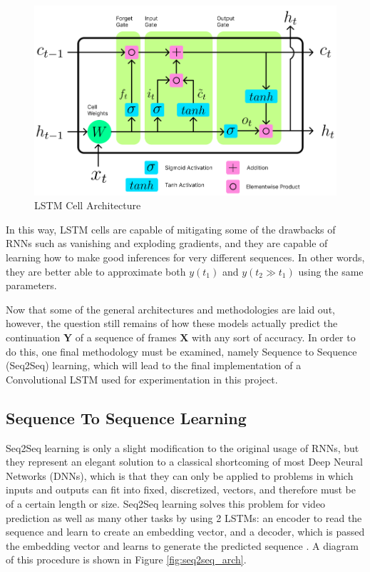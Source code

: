 \documentclass{scrartcl}
\begin{document}
\begin{figure}[H]
	\begin{center}
		\includegraphics[width=1\textwidth]{figures/lstmcell_arch.png}
	\end{center}
	\caption{LSTM Cell Architecture}
	\label{fig:lstmcell_arch}
\end{figure}

In this way, LSTM cells are capable of mitigating some of the drawbacks of RNNs
such as vanishing and exploding gradients, and they are capable of learning how
to make good inferences for very different sequences. In other words, they are
better able to approximate both $y ( t_1 )$ and $y ( t_2 \gg t_1 )$ using the
same parameters.

Now that some of the general architectures and methodologies are laid out,
however, the question still remains of how these models actually predict the
continuation $\boldsymbol{Y}$ of a sequence of frames $\boldsymbol{X}$ with any
sort of accuracy. In order to do this, one final methodology must be examined,
namely Sequence to Sequence (Seq2Seq) learning, which will lead to the final
implementation of a Convolutional LSTM used for experimentation in this
project.

\subsection{Sequence To Sequence Learning}
\label{subsec:seq2seq}

Seq2Seq learning is only a slight modification to the original usage of RNNs,
but they represent an elegant solution to a classical shortcoming of most Deep
Neural Networks (DNNs), which is that they can only be applied to problems in
which inputs and outputs can fit into fixed, discretized, vectors, and
therefore must be of a certain length or size. Seq2Seq learning solves this
problem for video prediction as well as many other tasks by using 2 LSTMs: an
encoder to read the sequence and learn to create an embedding vector, and a
decoder, which is passed the embedding vector and learns to generate the
predicted sequence \cite{seq2seq_original}. A diagram of this procedure is
shown in Figure \ref{fig:seq2seq_arch}.
\end{document}
